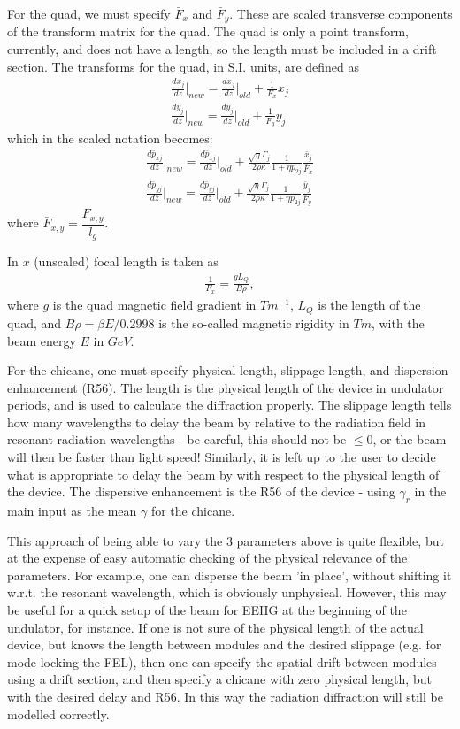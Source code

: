 \documentclass[12pt]{article}%
\begin{document}
For the quad, we must specify $\bar{F}_x$ and $\bar{F}_y$. These are scaled transverse components of the transform matrix for the quad. The quad is only a point transform, currently, and does not have a length, so the length must be included in a drift section. The transforms for the quad, in S.I. units, are defined as
\begin{align}
\frac{d x_j}{d z}  \bigg|_{new} = \frac{d x_j}{d z} \bigg|_{old} + \frac{1}{F_x} x_j \\
\frac{d y_j}{d z}  \bigg|_{new} = \frac{d y_j}{d z} \bigg|_{old} + \frac{1}{F_y} y_j
\end{align}
which in the scaled notation becomes:
\begin{align}
\frac{d \bar{p}_{xj}}{d \bar{z}} \bigg|_{new} = \frac{d \bar{p}_{xj}}{d \bar{z}}  \bigg|_{old} +\frac{\sqrt{\eta}\Gamma_j}{2\rho\kappa} \frac{1}{1+\eta p_{2j}}  \frac{\bar{x}_j}{\bar{F}_x} \\
\frac{d \bar{p}_{yj}}{d \bar{z}}  \bigg|_{new} = \frac{d \bar{p}_{yj}}{d \bar{z}}  \bigg|_{old} +\frac{\sqrt{\eta}\Gamma_j}{2\rho\kappa} \frac{1}{1+\eta p_{2j}}  \frac{\bar{y}_j}{\bar{F}_y}
\end{align}
where $\bar{F}_{x,y} = \dfrac{F_{x,y}}{l_g}$.

In $x$ (unscaled) focal length is taken as 
\begin{align}
\frac{1}{F_x} = \frac{g L_Q}{B\rho},
\end{align}
where $g$ is the quad magnetic field gradient in $Tm^{-1}$, $L_Q$ is the length of the quad, and $B\rho = \beta E / 0.2998$ is the so-called magnetic rigidity in $Tm$, with the beam energy $E$ in $GeV$. 

For the chicane, one must specify physical length, slippage length, and dispersion enhancement (R56). The length is the physical length of the device in undulator periods, and is used to calculate the diffraction properly. The slippage length tells how many wavelengths to delay the beam by relative to the radiation field in resonant radiation wavelengths - be careful, this should not be $\leq 0$, or the beam will then be faster than light speed! Similarly, it is left up to the user to decide what is appropriate to delay the beam by with respect to the physical length of the device. The dispersive enhancement is the R56 of the device - using $\gamma_r$ in the main input as the mean $\gamma$ for the chicane. 

This approach of being able to vary the 3 parameters above is quite flexible, but at the expense of easy automatic checking of the physical relevance of the parameters. For example, one can disperse the beam 'in place', without shifting it w.r.t. the resonant wavelength, which is obviously unphysical. However, this may be useful for a quick setup of the beam for EEHG at the beginning of the undulator, for instance. If one is not sure of the physical length of the actual device, but knows the length between modules and the desired slippage (e.g. for mode locking the FEL), then one can specify the spatial drift between modules using a drift section, and then specify a chicane with zero physical length, but with the desired delay and R56. In this way the radiation diffraction will still be modelled correctly.
\end{document}
